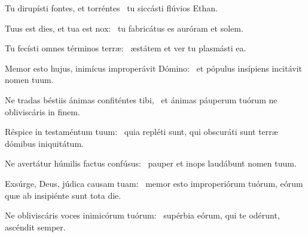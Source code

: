 \item Tu dirupísti fontes, et torréntes~\psstar{} tu siccásti flúvios Ethan.

\item Tuus est dies, et tua est nox:~\psstar{} tu fabricátus es auróram et solem.

\item Tu fecísti omnes términos terræ:~\psstar{} æstátem et ver tu plasmásti ea.

\item Memor esto hujus, inimícus improperávit Dómino:~\psstar{} et pópulus insípiens incitávit nomen tuum.

\item Ne tradas béstiis ánimas confiténtes tibi,~\psstar{} et ánimas páuperum tuórum ne obliviscáris in finem.

\item Réspice in testaméntum tuum:~\psstar{} quia repléti sunt, qui obscuráti sunt terræ dómibus iniquitátum.

\item Ne avertátur húmilis factus confúsus:~\psstar{} pauper et inops laudábunt nomen tuum.

\item Exsúrge, Deus, júdica causam tuam:~\psstar{} memor esto improperiórum tuórum, eórum quæ ab insipiénte sunt tota die.

\item Ne obliviscáris voces inimicórum tuórum:~\psstar{} supérbia eórum, qui te odérunt, ascéndit semper.